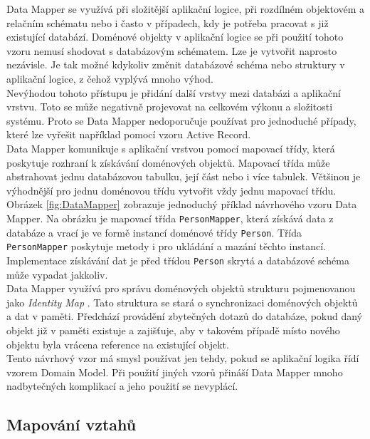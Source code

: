 \documentclass[ing,male,java,dept456]{diploma}						%
\begin{document}
Data Mapper se využívá při složitější aplikační logice, při rozdílném objektovém a relačním schématu nebo i často v případech, kdy je potřeba pracovat s již existující databází. Doménové objekty v aplikační logice se při použití tohoto vzoru nemusí shodovat s databázovým schématem. Lze je vytvořit naprosto nezávisle. Je tak možné kdykoliv změnit databázové schéma nebo struktury v aplikační logice, z čehož vyplývá mnoho výhod. \\
Nevýhodou tohoto přístupu je přidání další vrstvy mezi databázi a aplikační vrstvu. Toto se může negativně projevovat na celkovém výkonu a složitosti systému. Proto se Data Mapper nedoporučuje používat pro jednoduché případy, které lze vyřešit například pomocí vzoru Active Record.\\
Data Mapper komunikuje s aplikační vrstvou pomocí mapovací třídy, která poskytuje rozhraní k získávání doménových objektů. Mapovací třída může abstrahovat jednu databázovou tabulku, její část nebo i více tabulek. Většinou je výhodnější pro jednu doménovou třídu vytvořit vždy jednu mapovací třídu. \\
Obrázek \ref{fig:DataMapper} zobrazuje jednoduchý příklad návrhového vzoru Data Mapper. Na obrázku je  mapovací třída \lstinline[style=inlinepython]|PersonMapper|, která získává data z databáze a vrací je ve formě instancí doménové třídy \lstinline[style=inlinepython]|Person|. Třída \lstinline[style=inlinepython]|PersonMapper| poskytuje metody i pro ukládání a mazání těchto instancí. Implementace získávání dat je před třídou \lstinline[style=inlinepython]|Person| skrytá a databázové schéma může vypadat jakkoliv. \\
Data Mapper využívá pro správu doménových objektů strukturu pojmenovanou jako \textit{Identity Map} \cite{fowler}. Tato struktura se stará o synchronizaci doménových objektů a dat v paměti. Předchází provádění zbytečných dotazů do databáze, pokud daný objekt již v paměti existuje a zajišťuje, aby v takovém případě místo nového objektu byla vrácena reference na existující objekt. \\
Tento návrhový vzor má smysl používat jen tehdy, pokud se aplikační logika řídí vzorem Domain Model. Při použití jiných vzorů přináší Data Mapper mnoho nadbytečných komplikací a jeho použití se nevyplácí. \\


\subsection{Mapování vztahů}
\label{subsec:Relmapping}
\end{document}
